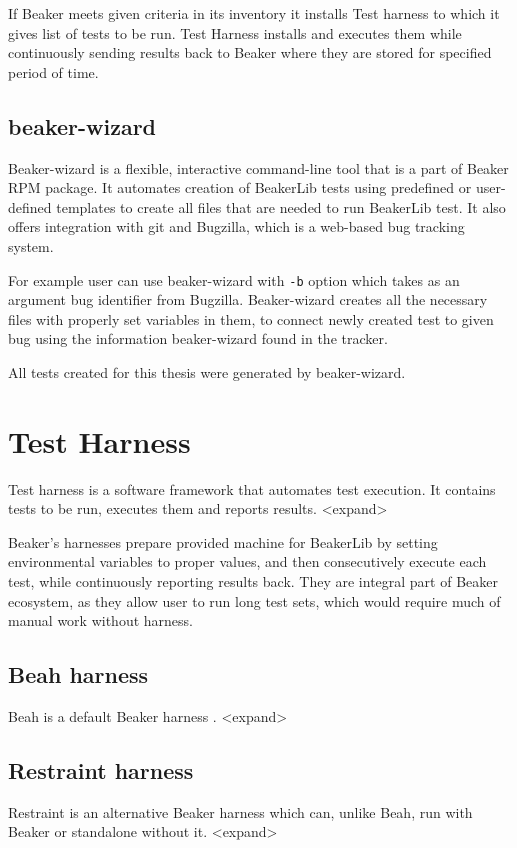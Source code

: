 If Beaker meets given criteria in its inventory it installs Test harness to which it gives list of tests to be run.  Test Harness installs and executes them while continuously sending results back to Beaker where they are stored for specified period of time. 

\subsection{beaker-wizard}
Beaker-wizard is a flexible, interactive command-line tool that is a part of Beaker RPM package. It automates creation of BeakerLib tests using predefined or user-defined templates to create all files that are needed to run BeakerLib test.  It also offers integration with git and Bugzilla, which is a web-based bug tracking system.

For example user can use beaker-wizard with \texttt{-b} option which takes as an argument bug identifier from Bugzilla. Beaker-wizard creates all the necessary files with properly set variables in them, to connect newly created test to given bug using the information beaker-wizard found in the tracker.

All tests created for this thesis were generated by beaker-wizard.

\section{Test Harness}
Test harness is a software framework that automates test execution. It contains tests to be run, executes them and reports results. <expand>

Beaker’s harnesses prepare provided machine for BeakerLib by setting environmental variables to proper values, and then consecutively execute each test, while continuously reporting results back. They are integral part of Beaker ecosystem, as they allow user to run long test sets, which would  require much of manual work without harness.

\subsection{Beah harness}
Beah \cite{beah_doc} is a default Beaker harness . <expand> 

\subsection{Restraint harness}
Restraint \cite{restraint_doc} is an alternative Beaker harness which can, unlike Beah, run with Beaker or standalone without it. <expand>


